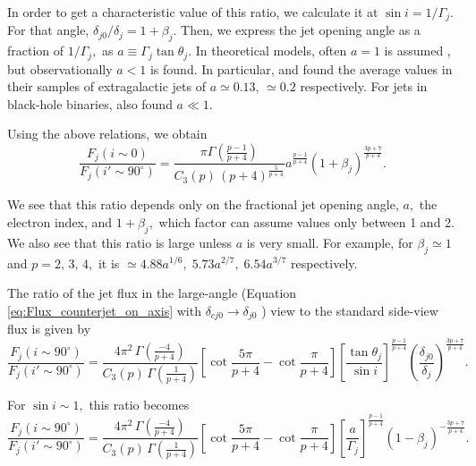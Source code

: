 In order to get a characteristic value of this ratio, we calculate it at $ \sin i = 1 / \Gamma_j . $ For that angle, $ \delta_{j0} / \delta_j = 1 + \beta_j . $ Then, we express the jet opening angle as a fraction of $ 1 / \Gamma_j , $ as $ a \equiv \Gamma_j \tan \theta_j . $ In theoretical models, often $ a = 1 $ is assumed \citep{Zamaninasab_et_al.-2014-Nature}, but observationally $ a < 1 $ is found. In particular, \citealt{Pushkarev_et_al.-2009-A&A} and \citealt{Clausen-Brown_et_al.-2013-A&A} found the average values in their samples of extragalactic jets of $ a \simeq 0.13 , \, \simeq 0.2 $ respectively. For jets in black-hole binaries, \citealt{Miller-Jones_et_al.-2006-MNRAS} also found $ a \ll 1 . $

Using the above relations, we obtain
\begin{equation}
\frac{F_j (i \sim 0)} {F_j ( i' \sim 90^{\circ} ) } = 
\dfrac{\pi \Gamma \left( \frac{p-1}{p+4} \right)}{C_3(p) \, (p+4)^{\frac{5}{p+4}}} a^{\frac{p-1}{p+4}}  ( 1 + \beta_j)^{\frac{3p+7}{p+4}}.
\end{equation}

We see that this ratio depends only on the fractional jet opening angle, $ a , $ the electron index, and $ 1 + \beta_j , $ which factor can assume values only between 1 and 2. We also see that this ratio is large unless $ a $ is very small. For example, for $ \beta_j \simeq 1 $ and $ p = 2 , \, 3, \, 4, $ it is $ \simeq  4.88 a^{1/6}, \; 5.73 a^{2/7} , \; 6.54 a^{3/7} $ respectively.


The ratio of the jet flux in the large-angle (Equation \ref{eq:Flux_counterjet_on_axis} with $ \delta_{cj0} \rightarrow \delta_{j0} $ ) view to the standard side-view flux is given by
\begin{equation}
\frac{F_j (i \sim 90^{\circ})}{F_j (i' \sim 90^{\circ})} = \dfrac{ 4 \pi^2 \, \Gamma \left( \frac{-4}{p+4} \right) }{ C_3(p) \, \Gamma \left( \frac{1}{p+4} \right) } [\cot \frac{5 \pi}{p+4} - \cot \frac{\pi}{p+4} ] \left[ \frac{\tan \theta_j}{\sin i} \right]^{ \frac{p-1}{p+4} } \left( \frac{\delta_{j0}}{\delta_j} \right)^{ \frac{3p+7}{p+4} }.
\end{equation}

For $ \sin i \sim 1 , $ this ratio becomes
\begin{equation}
\frac{F_j (i \sim 90^{\circ})}{F_j (i' \sim 90^{\circ})} = \dfrac{ 4 \pi^2 \, \Gamma \left( \frac{-4}{p+4} \right) }{ C_3(p) \, \Gamma \left( \frac{1}{p+4} \right) } [\cot \frac{5 \pi}{p+4} - \cot \frac{\pi}{p+4} ] \left[ \frac{a}{\Gamma_j} \right]^{ \frac{p-1}{p+4} } \left( {1 - \beta_j} \right)^{-\frac{3p+7}{p+4}}.
\end{equation}



